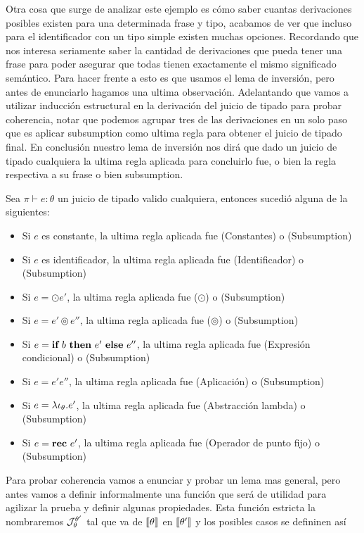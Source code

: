 Otra cosa que surge de analizar este ejemplo es c\'omo saber cuantas derivaciones
posibles existen para una determinada frase y tipo, acabamos de ver que
incluso para el identificador con un tipo simple existen muchas opciones.
Recordando que nos interesa seriamente saber la cantidad de derivaciones 
que pueda tener una frase para poder asegurar que todas tienen exactamente
el mismo significado sem\'antico. Para hacer frente a esto es que usamos 
el lema de inversi\'on, pero antes de enunciarlo hagamos una ultima observaci\'on.
Adelantando que vamos a utilizar inducci\'on estructural en la derivaci\'on
del juicio de tipado para probar coherencia, notar que podemos agrupar
tres de las derivaciones en un solo paso que es aplicar 
subsumption como ultima regla para obtener el juicio de tipado final. En
conclusi\'on nuestro lema de inversi\'on nos dir\'a que dado un juicio de 
tipado cualquiera la ultima regla aplicada para concluirlo fue, o bien
la regla respectiva a su frase o bien subsumption.

\begin{lemma}[De inversi\'on]
Sea $\pi \vdash e : \theta$ un juicio de tipado valido cualquiera, entonces
sucedi\'o alguna de la siguientes:

\begin{itemize}
\item Si $e$ es constante, la ultima regla aplicada fue (Constantes) o (Subsumption)
\item Si $e$ es identificador, la ultima regla aplicada fue (Identificador) o (Subsumption)
\item Si $e = \odot e'$, la ultima regla aplicada fue ($\odot$) o (Subsumption)
\item Si $e = e' \circledcirc e''$, la ultima regla aplicada fue 
($\circledcirc$) o (Subsumption)
\item Si $e = \textbf{if} \ b \ \textbf{then} \ e' \ \textbf{else} \ e''$, la ultima regla aplicada fue 
(Expresi\'on condicional) o (Subsumption)
\item Si $e = e'e''$, la ultima regla aplicada fue (Aplicaci\'on) o (Subsumption)
\item Si $e = \lambda \iota_{\theta} . e'$, la ultima regla aplicada fue 
(Abstracci\'on lambda) o (Subsumption)
\item Si $e = \textbf{rec} \ e'$, la ultima regla aplicada fue (Operador de punto fijo) o (Subsumption)
\end{itemize}

\end{lemma}

Para probar coherencia vamos a enunciar y probar un lema mas general,
pero antes vamos a definir informalmente una 
funci\'on que ser\'a de utilidad para agilizar la prueba y definir algunas
propiedades. Esta funci\'on estricta la nombraremos $\mathcal{J}_{\theta}^{\theta'}$ tal que
va de $\llbracket \theta \rrbracket$ en $\llbracket \theta' \rrbracket$ y los posibles casos se defininen as\'i\\

